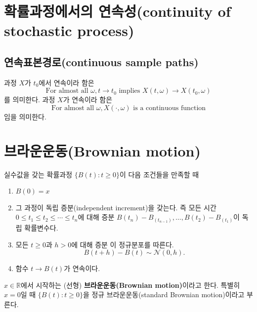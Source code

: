 \documentclass[b5paper,]{scrbook}
\theoremstyle{plain}
\theoremstyle{definition}
\numberwithin{equation}{section}
\let\BeginKnitrBlock\begin \let\EndKnitrBlock\end
\begin{document}
\section{확률과정에서의 연속성(continuity of stochastic
process)}\label{-continuity-of-stochastic-process}

\subsection{연속표본경로(continuous sample
paths)}\label{continuous-sample-paths}

\BeginKnitrBlock{definition}[연속표본경로]
\protect\hypertarget{def:unnamed-chunk-73}{}{\label{def:unnamed-chunk-73}
{} }과정 \(X\)가 \(t_{0}\)에서 연속이라 함은
\[\text{For almost all }\omega, t \rightarrow t_{0} \text{ implies } X(t,\omega) \rightarrow X(t_{0},\omega)\]
를 의미한다. 과정 \(X\)가 연속이라 함은
\[\text{For almost all }\omega, X(\cdot, \omega) \text{ is a continuous function}\]
임을 의미한다.
\EndKnitrBlock{definition}

\section{브라운운동(Brownian motion)}\label{brownian-motion}

\BeginKnitrBlock{definition}[저차원에서의 브라운운동]
\protect\hypertarget{def:unnamed-chunk-74}{}{\label{def:unnamed-chunk-74}
{} }실수값을 갖는 확률과정
\(\{ B(t) : t\geq 0\}\)이 다음 조건들을 만족할 때

\begin{enumerate}
\def\labelenumi{\arabic{enumi}.}
\item
  \(B(0)=x\)
\item
  그 과정이 독립 증분(independent increment)을 갖는다. 즉 모든 시간
  \(0 \leq t_{1} \leq t_{2} \leq \cdots \leq t_{n}\)에 대해 증분
  \(B(t_{n})-B_(t_{n-1}),\ldots, B(t_{2})-B_(t_{1})\)이 독립 확률변수다.
\item
  모든 \(t \geq 0\)과 \(h > 0\)에 대해 증분 이 정규분포를 따른다.
  \[B(t+h)-B(t) \sim \mathcal{N}(0,h).\]
\item
  함수 \(t \rightarrow B(t)\)가 연속이다.
\end{enumerate}

\(x\in\mathbb{R}\)에서 시작하는 (선형) \textbf{브라운운동(Brownian
motion)}이라고 한다. 특별히 \(x=0\)일 때 \(\{ B(t): t\geq 0\}\)을 정규
브라운운동(standard Brownian motion)이라고 부른다.
\EndKnitrBlock{definition}
\end{document}
